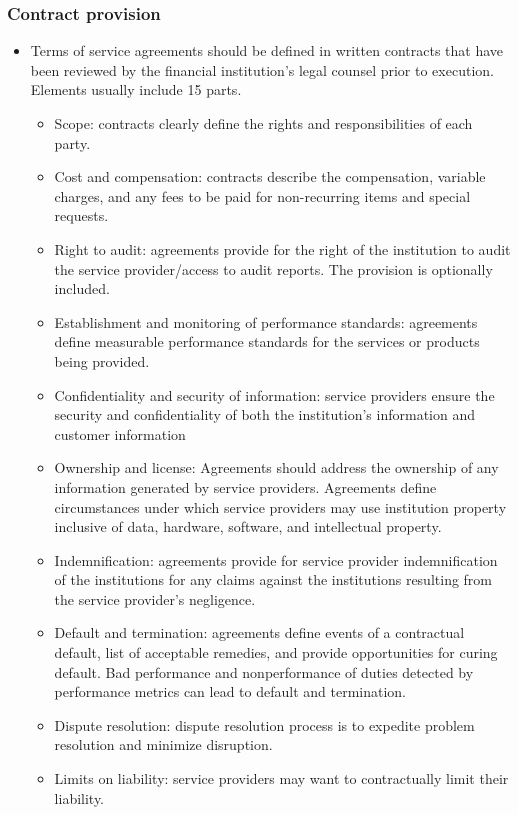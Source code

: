 \subsubsection{Contract provision }
\begin{itemize}
\item Terms of service agreements should be defined in written contracts that have been reviewed by the financial institution's legal counsel prior to execution. Elements usually include 15 parts.
    \begin{itemize}
    \item Scope: contracts clearly define the rights and responsibilities of each party.
    \item  Cost and compensation: contracts describe the compensation, variable charges, and any fees to be paid for non-recurring items and special requests.
    \item Right to audit: agreements provide for the right of the institution to audit the service provider/access to audit reports. The provision is optionally included.
    \item Establishment and monitoring of performance standards: agreements define measurable performance standards for the services or products being provided.
    \item Confidentiality and security of information: service providers ensure the security and confidentiality of both the institution's information and customer information
    \item Ownership and license: Agreements should address the ownership of any information generated by service providers. Agreements define circumstances under which service providers may use institution property inclusive of data, hardware, software, and intellectual property.
    \item  Indemnification: agreements provide for service provider indemnification of the institutions for any claims against the institutions resulting from the service provider's negligence. 
    \item Default and termination: agreements define events of a contractual default, list of acceptable remedies, and provide opportunities for curing default. Bad performance and nonperformance of duties detected by performance metrics can lead to default and termination.
    \item Dispute resolution: dispute resolution process is to expedite problem resolution and minimize disruption.
    \item Limits on liability: service providers may want to contractually limit their liability.

\end{itemize}
\end{itemize}
